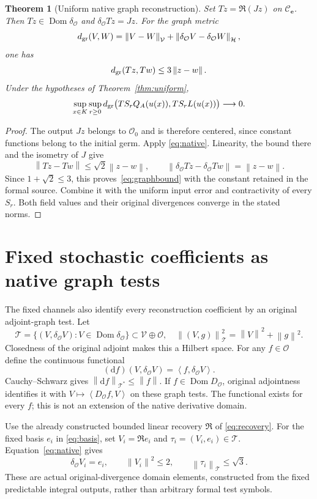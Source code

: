 \documentclass[11pt]{article}
\newtheorem{theorem}{Theorem}[section]
\theoremstyle{remark}\newtheorem{remark}[theorem]{Remark}
\newcommand{\norm}[1]{\left\lVert#1\right\rVert}
\newcommand{\inner}[2]{\left\langle#1,#2\right\rangle}
\newcommand{\HH}{\mathcal H}
\newcommand{\OO}{\mathcal O}
\newcommand{\Dom}{\operatorname{Dom}}
\begin{document}
\begin{theorem}[Uniform native graph reconstruction]\label{thm:native}
Set $Tz=\mathfrak R(Jz)$ on $\mathcal C_{\mathbf e}$. Then
$Tz\in\Dom\delta_{\OO}$ and $\delta_{\OO}Tz=Jz$.
For the graph metric
\[
 d_{\rm gr}(V,W)=\norm{V-W}_{\mathcal V}+
                     \norm{\delta_{\OO}V-\delta_{\OO}W}_{\HH},
\]
one has
\begin{equation}\label{eq:graphbound}
 d_{\rm gr}(Tz,Tw)\leq3\norm{z-w}.
\end{equation}
Under the hypotheses of Theorem~\ref{thm:uniform},
\[
 \sup_{x\in K}\sup_{r\geq0}
 d_{\rm gr}\bigl(TS_rQ_A(u(x)),TS_rL(u(x))\bigr)
 \longrightarrow0.
\]
\end{theorem}
\begin{proof}
The output $Jz$ belongs to $\OO_0$ and is therefore centered, since
constant functions belong to the initial germ. Apply
\eqref{eq:native}. Linearity, the bound there and the isometry of
$J$ give
\[
 \norm{Tz-Tw}\leq\sqrt2\norm{z-w},\qquad
 \norm{\delta_{\OO}Tz-\delta_{\OO}Tw}=\norm{z-w}.
\]
Since $1+\sqrt2\leq3$, this proves~\eqref{eq:graphbound} with the
constant retained in the formal source. Combine it with the uniform
input error and contractivity of every $S_r$. Both field values and
their original divergences converge in the stated norms.
\end{proof}


\section{Fixed stochastic coefficients as native graph tests}
\label{sec:graphtests}
The fixed channels also identify every reconstruction coefficient by
an original adjoint-graph test. Let
\[
 \mathcal T=\{(V,\delta_{\OO}V):V\in\Dom\delta_{\OO}\}
       \subset\mathcal V\oplus\OO,
 \quad \norm{(V,g)}_{\mathcal T}^2=\norm V^2+\norm g^2.
\]
Closedness of the original adjoint makes this a Hilbert space. For
any $f\in\OO$ define the continuous functional
\[
 (\mathrm d f)(V,\delta_{\OO}V)=\inner f{\delta_{\OO}V}.
\]
Cauchy--Schwarz gives $\norm{\mathrm d f}_{\mathcal T^*}\leq\norm f$.
If $f\in\Dom D_{\OO}$, original adjointness identifies it with
$V\mapsto\inner{D_{\OO}f}V$ on these graph tests. The functional
exists for every $f$; this is not an extension of the native derivative
domain.

Use the already constructed bounded linear recovery $\mathfrak R$
of \eqref{eq:recovery}. For the fixed basis $e_i$ in \eqref{eq:basis},
set $V_i=\mathfrak R e_i$ and $\tau_i=(V_i,e_i)\in\mathcal T$.
Equation~\eqref{eq:native} gives
\[
 \delta_{\OO}V_i=e_i,\qquad \norm{V_i}^2\leq2,
 \qquad \norm{\tau_i}_{\mathcal T}\leq\sqrt3.
\]
These are actual original-divergence domain elements, constructed
from the fixed predictable integral outputs, rather than arbitrary
formal test symbols.
\end{document}
